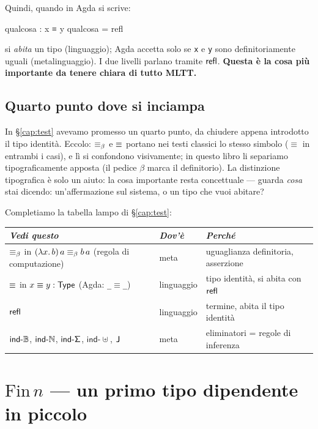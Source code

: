 \bigskip

\noindent Quindi, quando in Agda si scrive:
\begin{agda}
qualcosa : x ≡ y
qualcosa = refl
\end{agda}
si \emph{abita} un tipo (linguaggio); Agda accetta solo se \texttt{x} e \texttt{y} sono definitoriamente uguali (metalinguaggio). I due livelli parlano tramite $\mathsf{refl}$. \textbf{Questa \`e la cosa pi\`u importante da tenere chiara di tutto MLTT.}

\section*{Quarto punto dove si inciampa}

In \S\ref{cap:test} avevamo promesso un quarto punto, da chiudere appena introdotto il tipo identit\`a. Eccolo: $\equiv_{\beta}$ e $\equiv$ portano nei testi classici lo stesso simbolo ($\equiv$ in entrambi i casi), e l\`i si confondono visivamente; in questo libro li separiamo tipograficamente apposta (il pedice $\beta$ marca il definitorio). La distinzione tipografica \`e solo un aiuto: la cosa importante resta concettuale --- guarda \emph{cosa} stai dicendo: un'affermazione sul sistema, o un tipo che vuoi abitare?

\medskip

Completiamo la tabella lampo di \S\ref{cap:test}:

\begin{center}
\renewcommand{\arraystretch}{1.15}
\begin{tabular}{lll}
\toprule
\textit{Vedi questo} & \textit{Dov'\`e} & \textit{Perch\'e} \\
\midrule
$\equiv_{\beta}$ in $(\lambda x.\,b)\,a \equiv_{\beta} b\,a$ (regola di computazione) & meta & uguaglianza definitoria, asserzione \\
$\equiv$ in $x \equiv y : \mathsf{Type}$ (Agda: \texttt{\_$\equiv$\_}) & linguaggio & tipo identit\`a, si abita con $\mathsf{refl}$ \\
$\mathsf{refl}$ & linguaggio & termine, abita il tipo identit\`a \\
$\mathsf{ind\text{-}\mathbb{B}}$, $\mathsf{ind\text{-}\mathbb{N}}$, $\mathsf{ind\text{-}\Sigma}$, $\mathsf{ind}\text{-}\uplus$, $\mathsf{J}$ & meta & eliminatori = regole di inferenza \\
\bottomrule
\end{tabular}
\end{center}

\chapter{$\mathrm{Fin}\,n$ --- un primo tipo dipendente in piccolo}\label{cap:fin}


